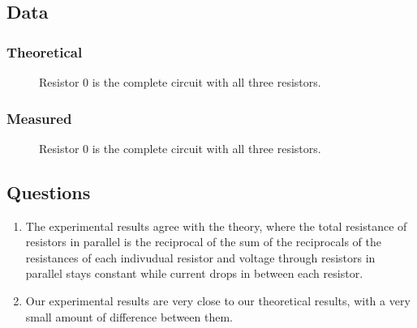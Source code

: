 \documentclass{article}
\begin{document}
\subsection{Data}
\subsubsection{Theoretical}
\begin{figure}[H]
    \begin{center}
        \caption{Resistor 0 is the complete circuit with all three resistors.}
    \end{center}
\end{figure}
\subsubsection{Measured}
\begin{figure}[H]
    \begin{center}
        \caption{Resistor 0 is the complete circuit with all three resistors.}
    \end{center}
\end{figure}
\subsection{Questions}
\begin{enumerate}
    \item The experimental results agree with the theory, where the total resistance of resistors in parallel is the reciprocal of the sum of the reciprocals of the resistances of each indivudual resistor and voltage through resistors in parallel stays constant while current drops in between each resistor.
    \item Our experimental results are very close to our theoretical results, with a very small amount of difference between them.
\end{enumerate}
\end{document}
